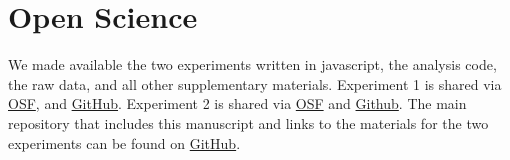 \documentclass[10pt,letterpaper]{article}
\begin{document}
\section{Open Science}

We made available the two experiments written in javascript, the analysis code, the raw data, and all other supplementary materials.
Experiment 1 is shared via \href{https://osf.io/auwvt/?view_only=2dc8384074fa4bcf9f2e3937fdaee2b4}{OSF}, and \href{https://github.com/lenarddome/ply216-observational-ibre}{GitHub}.
Experiment 2 is shared via \href{https://osf.io/2tmc4/?view_only=489ebc888ef84a6b9b904072cfbe74df}{OSF} and \href{https://github.com/lenarddome/ply222-non-causal-ibre}{Github}.
The main repository that includes this manuscript and links to the materials for the two experiments can be found on \href{https://github.com/lenarddome/pu093-errorless-attentionless-ibre}{GitHub}.



\setlength{\bibleftmargin}{.125in}
\setlength{\bibindent}{-\bibleftmargin}


\end{document}
